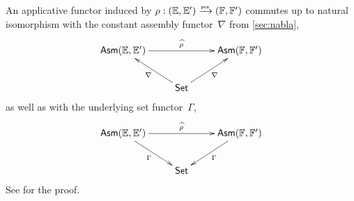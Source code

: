 An applicative functor induced by $\rho : ({\mathbb{E}}, {\mathbb{E}'}) \xrightarrow{\scriptscriptstyle\mathsf{pca}}{} ({\mathbb{F}}, {\mathbb{F}'})$ commutes up to natural isomorphism with the constant assembly functor~$\nabla$ from \cref{sec:nabla},
%
\begin{equation*}
  \xymatrix{
    {\Asm{\EE, \subEE}}
    \ar[rr]^{\ff{\rho}}
    & &
    {\Asm{\FF, \subFF}}
    \\
    & {\Set}
    \ar[ur]_{\nabla}
    \ar[ul]^{\nabla}
  }
\end{equation*}
%
as well as with the underlying set functor~$\Gamma$,
%
\begin{equation*}
  \xymatrix{
    {\Asm{\EE, \subEE}}
    \ar[rr]^{\ff{\rho}}
    \ar[dr]_{\Gamma}
    & &
    {\Asm{\FF, \subFF}}
    \ar[dl]^{\Gamma}
    \\
    & {\Set}
  }
\end{equation*}
%
See \cite[Proposition 2.2.4]{Longley:94} for the proof.

